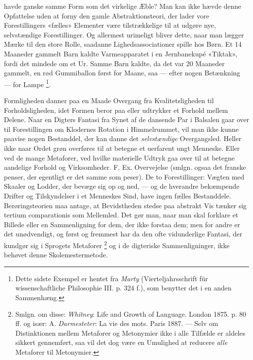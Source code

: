 \documentclass[12pt,a4paper,openany]{book}
\newcommand{\opage}[1]{\marginnote{\footnotesize\textit{[#1]}}}
\begin{document}
havde ganske samme Form som det virkelige Æble? Man kan ikke hævde denne
Opfattelse uden at forny den gamle Abstraktionsteori, der lader vore
Forestillingers «fælles» Elementer være tilstrækkelige til at udgøre nye,
selvstændige Forestillinger. Og allermest urimeligt bliver dette, naar man
lægger Mærke til den store Rolle, saadanne Lighedsassociationer spille hos
Børn. Et 14 Maaneder gammelt Barn kaldte Varmeapparatet i en Jernbanekupé
«Tiktak», fordi det mindede om et Ur. Samme Barn kaldte, da det var 20 Maaneder
gammelt, en rød Gummiballon først for Maane, saa --- efter nogen Betænkning ---
for Lampe%
\footnote[1]{Dette sidste Exempel er hentet fra \emph{Marty}
(Vierteljahrsschrift für wissenschaftliche Philosophie III. p. 324 f.), som
benytter det i en anden Sammenhæng.}.

Formligheden danner paa en Maade Overgang fra Kvalitetsligheden til
Forholdsligheden, idet Formen beror paa eller udtrykker et Forhold mellem
Delene. Naar en Digters Fantasi fra Synet af de dansende Par i Balsalen gaar
over til Forestillingen om Klodernes Rotation i Himmelrummet, vil man ikke
kunne paavise nogen Bestanddel, der kan danne det \emph{selvstændige}
Overgangsled. Heller ikke naar Ordet grøn overføres til at betegne et uerfarent
ungt Menneske. Eller ved de mange Metaforer, ved hvilke materielle Udtryk gaa
\setcounter{footnote}{0}%
\opage{46}over til at betegne aandelige Forhold og Virksomheder. F. Ex.
Overvejelse (smlgn. ogsaa det franske penser, der egentligt er det samme som
peser). De to Forestillinger: Vægten med Skaaler og Lodder, der bevæge sig op
og ned, --- og de hverandre bekæmpende Drifter og Tilskyndelser i et Menneskes
Sind, have ingen fælles Bestanddele. Berøringsteorien maa antage, at
Bevidstheden stedse paa abstrakt Vis tænker sig tertium comparationis som
Mellemled. Det gør man, naar man skal forklare et Billede eller en
Sammenligning for dem, der ikke forstaa dem; men for andre er det unødvendigt,
og først og fremmest har da den ofte vidunderlige Fantasi, der kundgør sig i
Sprogets Metaforer%
\footnote[1]{Smlgn. om disse: \emph{Whitney}: Life and Growth of Language.
London 1875. p. 80 ff. og især: A. \emph{Darmesteter}: La vie des mots. Paris
1887. --- Selv om Distinktionen mellem Metaforer og Metonymier ikke i alle
Tilfælde er aldeles sikkert gennemført, saa vil det dog være en Umulighed at
reducere \emph{alle} Metaforer til Metonymier.} og i de digteriske
Sammenligninger, ikke behøvet denne Skolemestermetode.
\end{document}
